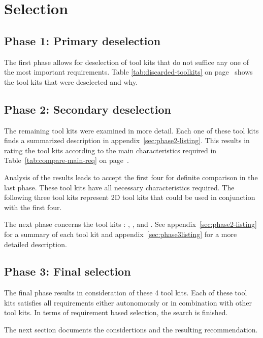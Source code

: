 \section{Selection}

\subsection{Phase 1: Primary deselection}

The first phase allows for deselection of tool kits that do not suffice any one
of the most important requirements.  Table \ref{tab:discarded-toolkits} on
page~\pageref{tab:discarded-toolkits} shows the tool kits that were deselected
and why.

\subsection{Phase 2: Secondary deselection}

The remaining tool kits were examined in more detail. Each one of these tool
kits finds a summarized description in appendix~\ref{sec:phase2-listing}.  This
results in rating the tool kits according to the main characteristics required
in Table~\ref{tab:compare-main-req} on page~\pageref{tab:compare-main-req}.

Analysis of the results leads to accept the first four for definite 
comparison in the last phase. These tool kits have all necessary
characteristics required. The following three tool kits represent
2D tool kits that could be used in conjunction with the first four.

The next phase concerns the tool kits : , ,  and
. See appendix~\ref{sec:phase2-listing} for a summary of each tool kit
and appendix~\ref{sec:phase3listing} for a more detailed description.

\subsection{Phase 3: Final selection}

The final phase results in consideration of these 4 tool kits. Each of these
tool kits satisfies all requirements either autonomously or in combination with
other tool kits. In terms of requirement based selection, the search is
finished.

The next section documents the considertions and the resulting recommendation.

